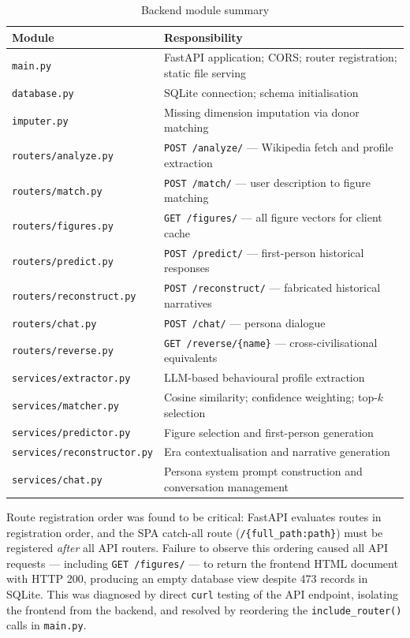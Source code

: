 \documentclass[11pt, a4paper]{report}
\begin{document}
\begin{table}[H]
  \centering
  \caption{Backend module summary}
  \label{tab:modules}
  \begin{tabular}{p{4.5cm}p{8cm}}
    \toprule
    Module & Responsibility \\
    \midrule
    \texttt{main.py} & FastAPI application; CORS; router registration; static file serving \\
    \texttt{database.py} & SQLite connection; schema initialisation \\
    \texttt{imputer.py} & Missing dimension imputation via donor matching \\
    \texttt{routers/analyze.py} & \texttt{POST /analyze/} — Wikipedia fetch and profile extraction \\
    \texttt{routers/match.py} & \texttt{POST /match/} — user description to figure matching \\
    \texttt{routers/figures.py} & \texttt{GET /figures/} — all figure vectors for client cache \\
    \texttt{routers/predict.py} & \texttt{POST /predict/} — first-person historical responses \\
    \texttt{routers/reconstruct.py} & \texttt{POST /reconstruct/} — fabricated historical narratives \\
    \texttt{routers/chat.py} & \texttt{POST /chat/} — persona dialogue \\
    \texttt{routers/reverse.py} & \texttt{GET /reverse/\{name\}} — cross-civilisational equivalents \\
    \texttt{services/extractor.py} & LLM-based behavioural profile extraction \\
    \texttt{services/matcher.py} & Cosine similarity; confidence weighting; top-$k$ selection \\
    \texttt{services/predictor.py} & Figure selection and first-person generation \\
    \texttt{services/reconstructor.py} & Era contextualisation and narrative generation \\
    \texttt{services/chat.py} & Persona system prompt construction and conversation management \\
    \bottomrule
  \end{tabular}
\end{table}

Route registration order was found to be critical: FastAPI evaluates routes in registration order, and the SPA catch-all route (\texttt{/\{full\_path:path\}}) must be registered \textit{after} all API routers. Failure to observe this ordering caused all API requests — including \texttt{GET /figures/} — to return the frontend HTML document with HTTP 200, producing an empty database view despite 473 records in SQLite. This was diagnosed by direct \texttt{curl} testing of the API endpoint, isolating the frontend from the backend, and resolved by reordering the \texttt{include\_router()} calls in \texttt{main.py}.
\end{document}
